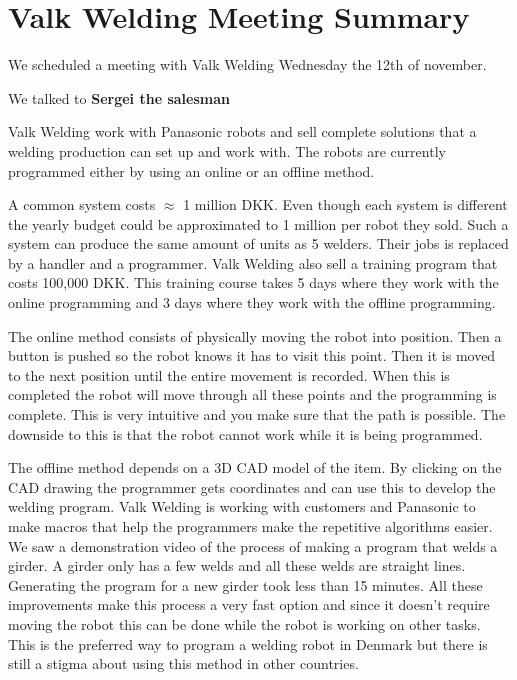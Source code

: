 \section{Valk Welding Meeting Summary}\label{Valk_meeting_resume}
We scheduled a meeting with Valk Welding Wednesday the 12th of november.

We talked to \textbf{Sergei the salesman}

Valk Welding work with Panasonic robots and sell complete solutions that a welding production can set up and work with. 
The robots are currently programmed either by using an online or an offline method. 

A common system costs \(\approx\) 1 million DKK. 
Even though each system is different the yearly budget could be approximated to 1 million per robot they sold.
Such a system can produce the same amount of units as 5 welders.
Their jobs is replaced by a handler and a programmer. 
Valk Welding also sell a training program that costs 100,000 DKK.
This training course takes 5 days where they work with the online programming and 3 days where they work with the offline programming.

The online method consists of physically moving the robot into position. Then a button is pushed so the robot knows it has to visit this point.
Then it is moved to the next position until the entire movement is recorded.
When this is completed the robot will move through all these points and the programming is complete.
This is very intuitive and you make sure that the path is possible.
The downside to this is that the robot cannot work while it is being programmed.

The offline method depends on a 3D CAD model of the item. 
By clicking on the CAD drawing the programmer gets coordinates and can use this to develop the welding program.
Valk Welding is working with customers and Panasonic to make macros that help the programmers make the repetitive algorithms easier.
We saw a demonstration video of the process of making a program that welds a girder. 
A girder only has a few welds and all these welds are straight lines. 
Generating the program for a new girder took less than 15 minutes. 
All these improvements make this process a very fast option and since it doesn't require moving the robot this can be done while the robot is working on other tasks.
This is the preferred way to program a welding robot in Denmark but there is still a stigma about using this method in other countries.

